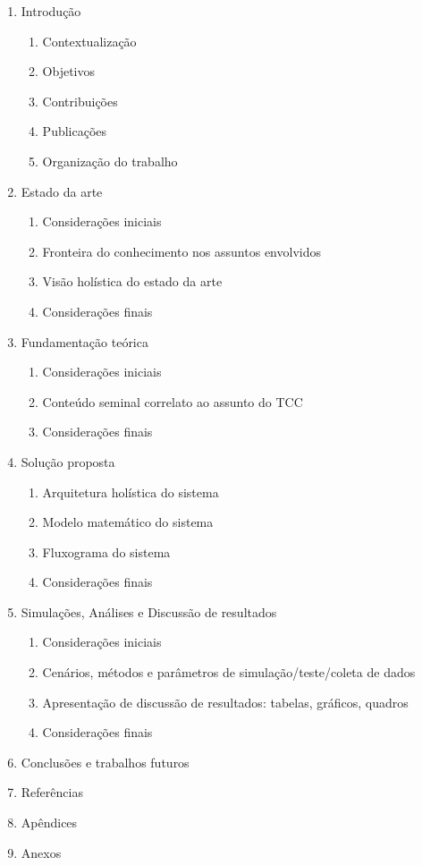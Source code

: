 \begin{enumerate}
	\item Introdução
	\begin{enumerate}
		\item Contextualização
		\item Objetivos
		\item Contribuições
		\item Publicações
		\item Organização do trabalho
	\end{enumerate}
	\item Estado da arte
	\begin{enumerate}
		\item Considerações iniciais
		\item Fronteira do conhecimento nos assuntos envolvidos
		\item Visão holística do estado da arte 
		\item Considerações finais
	\end{enumerate}
	\item Fundamentação teórica
	\begin{enumerate}
		\item Considerações iniciais
		\item Conteúdo seminal correlato ao assunto do TCC 
		\item Considerações finais
	\end{enumerate}	
	\item Solução proposta 
	\begin{enumerate}
		\item Arquitetura holística do sistema
		\item Modelo matemático do sistema
		\item Fluxograma do sistema
		\item Considerações finais
	\end{enumerate}
	\item Simulações, Análises e Discussão de resultados
	\begin{enumerate}
		\item Considerações iniciais
		\item Cenários, métodos e parâmetros de simulação/teste/coleta de dados
		\item Apresentação de discussão de resultados: tabelas, gráficos, quadros
		\item Considerações finais
	\end{enumerate}
	\item Conclusões e trabalhos futuros
	\item Referências
	\item Apêndices
	\item Anexos
\end{enumerate}


